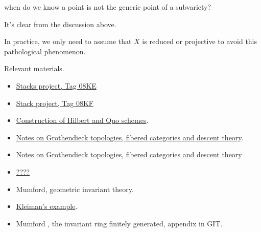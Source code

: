 \documentclass[main.tex]{subfiles}
\begin{document}
\begin{remark}
when do we know a point is not the generic point of a subvariety?
\end{remark}
\begin{remark}
It's clear from the discussion above.
\end{remark}


\begin{example}

\end{example}
\begin{remark}
In practice, we only need to assume that $X$ is reduced or projective to avoid this pathological phenomenon.
\end{remark}
Relevant materials. 
\begin{itemize}
    \item \href{http://stacks.math.columbia.edu/tag/08KE}{Stacks project, Tag 08KE}
    \item \href{http://stacks.math.columbia.edu/tag/08KF}{Stack project, Tag 08KF}
    \item \href{https://perso.univ-rennes1.fr/matthieu.romagny/GT_Hilb/Nitsure_Construction_of_Hilbert_and_Quot_schemes.pdf}{Construction of Hilbert and Quo schemes}.
    \item \href{https://ncatlab.org/ericforgy/published/Notes+on+Grothendieck+Topologies,+Fibered+Categories+and+Descent+Theory}{Notes on Grothendieck topologies, fibered categories and descent theory}.
    \item \href{https://arxiv.org/pdf/math/0412512.pdf}{Notes on Grothendieck topologies, fibered categories and descent theory}
    \item \href{http://download.springer.com/static/pdf/724/bok%253A978-3-540-36663-8.pdf?originUrl=http%3A%2F%2Flink.springer.com%2Fbook%2F10.1007%2FBFb0059750&token2=exp=1494637950~acl=%2Fstatic%2Fpdf%2F724%2Fbok%25253A978-3-540-36663-8.pdf%3ForiginUrl%3Dhttp%253A%252F%252Flink.springer.com%252Fbook%252F10.1007%252FBFb0059750*~hmac=b2d2e65bef6eb0ae94508d0b9b15497edd3e416f277ae7df8bc665978c4f97a0}{????}
\item Mumford, geometric invariant theory.
\item \href{https://books.google.com/books?id=jAWVmIz80A4C&pg=PA11&lpg=PA11&dq=Kleiman+example+nonreduced++nonprojective&source=bl&ots=AJbeQACcC9&sig=bWwICxG1h_sMxZjwRGJ1BeKajus&hl=en&sa=X&ved=0ahUKEwjIy8vi1OvTAhVh9IMKHTGJAYYQ6AEIIjAA#v=onepage&q=Kleiman example nonreduced nonprojective&f=false}{Kleiman's example}.
\item Mumford , the invariant ring finitely generated, appendix in GIT.
\end{itemize}
\end{document}
